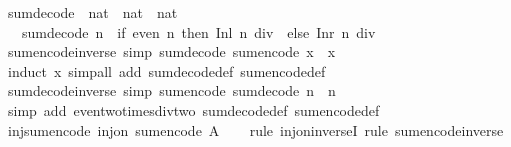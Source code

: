 \begin{isabellebody}
\isamarkupfalse%
\ sum{\isacharunderscore}decode\ {\isacharcolon}{\isacharcolon}\ {\isachardoublequoteopen}nat\ {\isasymRightarrow}\ nat\ {\isacharplus}\ nat{\isachardoublequoteclose}\isanewline
\ \ \ {\isachardoublequoteopen}sum{\isacharunderscore}decode\ n\ {\isacharequal}\ {\isacharparenleft}if\ even\ n\ then\ Inl\ {\isacharparenleft}n\ div\ {}{\isacharparenright}\ else\ Inr\ {\isacharparenleft}n\ div\ {}{\isacharparenright}{\isacharparenright}{\isachardoublequoteclose}\isanewline
\isanewline
{}\isamarkupfalse%
\ sum{\isacharunderscore}encode{\isacharunderscore}inverse\ {\isacharbrackleft}simp{\isacharbrackright}{\isacharcolon}\ {\isachardoublequoteopen}sum{\isacharunderscore}decode\ {\isacharparenleft}sum{\isacharunderscore}encode\ x{\isacharparenright}\ {\isacharequal}\ x{\isachardoublequoteclose}\isanewline
%
\isadelimproof
\ \ %
\endisadelimproof
%
\isatagproof
{}\isamarkupfalse%
\ {\isacharparenleft}induct\ x{\isacharparenright}\ {\isacharparenleft}simp{\isacharunderscore}all\ add{\isacharcolon}\ sum{\isacharunderscore}decode{\isacharunderscore}def\ sum{\isacharunderscore}encode{\isacharunderscore}def{\isacharparenright}%
\endisatagproof
{\isafoldproof}%
%
\isadelimproof
\isanewline
%
\endisadelimproof
\isanewline
{}\isamarkupfalse%
\ sum{\isacharunderscore}decode{\isacharunderscore}inverse\ {\isacharbrackleft}simp{\isacharbrackright}{\isacharcolon}\ {\isachardoublequoteopen}sum{\isacharunderscore}encode\ {\isacharparenleft}sum{\isacharunderscore}decode\ n{\isacharparenright}\ {\isacharequal}\ n{\isachardoublequoteclose}\isanewline
%
\isadelimproof
\ \ %
\endisadelimproof
%
\isatagproof
{}\isamarkupfalse%
\ {\isacharparenleft}simp\ add{\isacharcolon}\ even{\isacharunderscore}two{\isacharunderscore}times{\isacharunderscore}div{\isacharunderscore}two\ sum{\isacharunderscore}decode{\isacharunderscore}def\ sum{\isacharunderscore}encode{\isacharunderscore}def{\isacharparenright}%
\endisatagproof
{\isafoldproof}%
%
\isadelimproof
\isanewline
%
\endisadelimproof
\isanewline
{}\isamarkupfalse%
\ inj{\isacharunderscore}sum{\isacharunderscore}encode{\isacharcolon}\ {\isachardoublequoteopen}inj{\isacharunderscore}on\ sum{\isacharunderscore}encode\ A{\isachardoublequoteclose}\isanewline
%
\isadelimproof
\ \ %
\endisadelimproof
%
\isatagproof
{}\isamarkupfalse%
\ {\isacharparenleft}rule\ inj{\isacharunderscore}on{\isacharunderscore}inverseI{\isacharparenright}\ {\isacharparenleft}rule\ sum{\isacharunderscore}encode{\isacharunderscore}inverse{\isacharparenright}%

\end{isabellebody}
